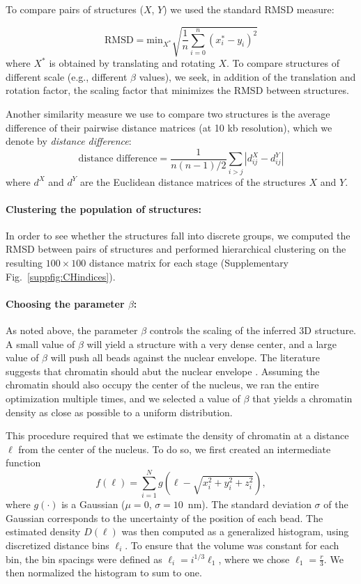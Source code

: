 To compare pairs of structures ($X$, $Y$) we used the standard RMSD measure:

\begin{equation}
\text{RMSD} = \text{min}_{X^*} \sqrt{\frac{1}{n} \sum_{i = 0}^n (x^*_i - y_i) ^ 2}
\end{equation}
where $X^*$ is obtained by translating and rotating $X$. To compare structures
of different scale (e.g., different $\beta$ values), we seek, in addition of the
translation and rotation factor, the scaling factor that minimizes the RMSD
between structures.

Another similarity measure we use to compare two structures is the average difference
of their pairwise distance matrices (at 10 kb resolution), which we denote by
\textit{distance difference}:
\begin{equation}
\text{distance difference} = \frac{1}{n(n - 1)/2} \sum_{i > j} |d^X_{ij} - d^Y_{ij}|
\end{equation}
where $d^X$ and $d^Y$ are the Euclidean distance matrices of the structures
$X$ and $Y$.

\paragraph{Clustering the population of structures:}

In order to see whether the structures fall into discrete groups, we computed
the RMSD between pairs of structures and performed hierarchical clustering on 
the resulting $100\times100$ distance matrix for each stage 
(Supplementary Fig.~\ref*{suppfig:CHindices}).

\paragraph{Choosing the parameter $\beta$:}
As noted above, the parameter $\beta$ controls the scaling of the inferred 3D
structure. A small value of $\beta$ will yield a structure with a very dense
center, and a large value of $\beta$ will push all beads against the nuclear
envelope. The literature suggests that chromatin should abut the nuclear
envelope \citep{weiner:3d}. Assuming the chromatin should also occupy the
center of the nucleus, we ran the entire optimization multiple times, and we
selected a value of $\beta$ that yields a chromatin density as close as
possible to a uniform distribution.

This procedure required that we estimate the density of chromatin at a
distance $\ell$ from the center of the nucleus.  To do so, we first
created an intermediate function
\[
f(\ell) = \sum_{i = 1}^N g\left(\ell - \sqrt{x_i ^2 + y_i^2 + z_i^2}\right),
\]
where $g(\cdot)$ is a Gaussian ($\mu = 0$, $\sigma = 10$~nm).  The
standard deviation $\sigma$ of the Gaussian corresponds to the
uncertainty of the position of each bead. The estimated density $D(\ell)$
was then computed as a generalized histogram, using discretized distance bins
$\ell_i$. To ensure that the volume was constant for each bin, the bin spacings
were defined as $\ell_i = i^{1 / 3} \ell_1$, where we chose $\ell_1 = \frac{r}{3}$.
We then normalized the histogram to sum to one.

